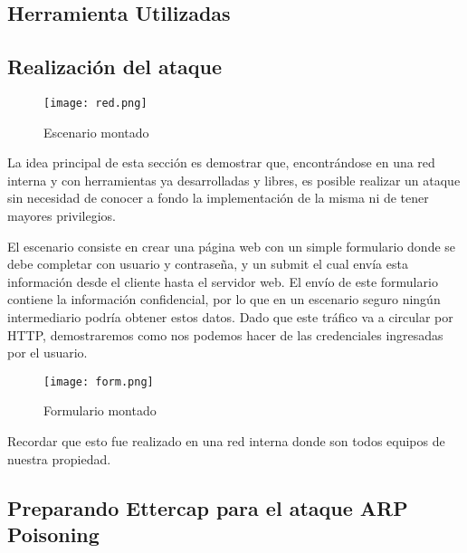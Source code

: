 
\subsection{Herramienta Utilizadas} 
    


\subsection{Realización del ataque}

\begin{center}
    \begin{figure}   
       \begin{center}
          \texttt{[image: red.png]}
       \end{center}
       \caption{Escenario montado}
    \end{figure}
 \end{center}

La idea principal de esta sección es demostrar que, encontrándose en una red interna
y con herramientas ya desarrolladas y libres, es posible realizar un ataque 
sin necesidad de conocer a fondo la implementación de la misma ni de tener mayores
privilegios.

El escenario consiste en crear una página web con un 
simple formulario donde se debe completar con usuario y contraseña, y un 
submit el cual envía esta información desde el cliente hasta el 
servidor web. El envío de este formulario contiene la información confidencial,
 por lo que en un escenario seguro ningún
intermediario podría obtener estos datos. Dado que este tráfico va a 
circular por HTTP, demostraremos como nos podemos hacer de las credenciales
ingresadas por el usuario.

\begin{center}
   \begin{figure}   
      \begin{center}
         \texttt{[image: form.png]}
      \end{center}
      \caption{Formulario montado}
   \end{figure}
\end{center}

Recordar que esto fue realizado en una red interna donde son todos equipos de nuestra propiedad.


\subsection{Preparando Ettercap para el ataque ARP Poisoning}

